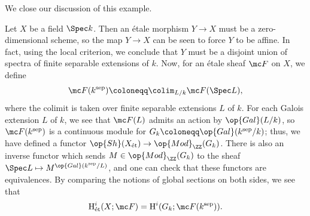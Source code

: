 \documentclass[../notes.tex]{subfiles}
\begin{document}
We close our discussion of this example.
\begin{example}
	Let $X$ be a field $\Spec k$. Then an \'etale morphism $Y\to X$ must be a zero-dimensional scheme, so the map $Y\to X$ can be seen to force $Y$ to be affine. In fact, using the local criterion, we conclude that $Y$ must be a disjoint union of spectra of finite separable extensions of $k$. Now, for an \'etale sheaf $\mc F$ on $X$, we define
	\[\mc F(k^{\mathrm{sep}})\coloneqq\colim_{L/k}\mc F(\Spec L),\]
	where the colimit is taken over finite separable extensions $L$ of $k$. For each Galois extension $L$ of $k$, we see that $\mc F(L)$ admits an action by $\op{Gal}(L/k)$, so $\mc F(k^{\mathrm{sep}})$ is a continuous module for $G_k\coloneqq\op{Gal}(k^{\mathrm{sep}}/k)$; thus, we have defined a functor $\op{Sh}(X_{\mathrm{\acute et}})\to\op{Mod}_\ZZ(G_k)$. There is also an inverse functor which sends $M\in\op{Mod}_\ZZ(G_k)$ to the sheaf $\Spec L\mapsto M^{\op{Gal}(k^{\mathrm{sep}}/L)}$, and one can check that these functors are equivalences. By comparing the notions of global sections on both sides, we see that
	\[\mathrm H^i_{\mathrm{\acute et}}(X;\mc F)=\mathrm H^i(G_k;\mc F(k^{\mathrm{sep}})).\]
\end{example}
\end{document}
